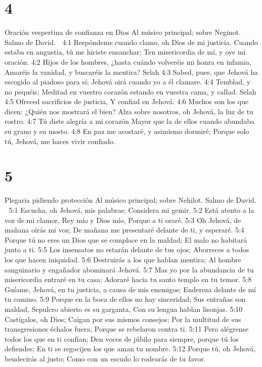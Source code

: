 \chapter{4}

Oración vespertina de confianza en Dios 
Al músico principal; sobre Neginot. Salmo de David. 

4:1 Respóndeme cuando clamo, oh Dios de mi justicia. 
Cuando estaba en angustia, tú me hiciste ensanchar; 
Ten misericordia de mí, y oye mi oración. 
4:2 Hijos de los hombres, ¿hasta cuándo volveréis mi honra en infamia, 
Amaréis la vanidad, y buscaréis la mentira? Selah 
4:3 Sabed, pues, que Jehová ha escogido al piadoso para sí; 
Jehová oirá cuando yo a él clamare. 
4:4 Temblad, y no pequéis; 
Meditad en vuestro corazón estando en vuestra cama, y callad. Selah 
4:5 Ofreced sacrificios de justicia, 
Y confiad en Jehová. 
4:6 Muchos son los que dicen: ¿Quién nos mostrará el bien? 
Alza sobre nosotros, oh Jehová, la luz de tu rostro. 
4:7 Tú diste alegría a mi corazón 
Mayor que la de ellos cuando abundaba su grano y su mosto. 
4:8 En paz me acostaré, y asimismo dormiré; 
Porque solo tú, Jehová, me haces vivir confiado. 

\chapter{5}

Plegaria pidiendo protección 
Al músico principal; sobre Nehilot. Salmo de David. 

5:1 Escucha, oh Jehová, mis palabras; 
Considera mi gemir. 
5:2 Está atento a la voz de mi clamor, Rey mío y Dios mío, 
Porque a ti oraré. 
5:3 Oh Jehová, de mañana oirás mi voz; 
De mañana me presentaré delante de ti, y esperaré. 
5:4 Porque tú no eres un Dios que se complace en la maldad; 
El malo no habitará junto a ti. 
5:5 Los insensatos no estarán delante de tus ojos; 
Aborreces a todos los que hacen iniquidad. 
5:6 Destruirás a los que hablan mentira; 
Al hombre sanguinario y engañador abominará Jehová. 
5:7 Mas yo por la abundancia de tu misericordia entraré en tu casa; 
Adoraré hacia tu santo templo en tu temor. 
5:8 Guíame, Jehová, en tu justicia, a causa de mis enemigos; 
Endereza delante de mí tu camino. 
5:9 Porque en la boca de ellos no hay sinceridad; 
Sus entrañas son maldad, 
Sepulcro abierto es su garganta, 
Con su lengua hablan lisonjas. 
5:10 Castígalos, oh Dios; 
Caigan por sus mismos consejos; 
Por la multitud de sus transgresiones échalos fuera, 
Porque se rebelaron contra ti. 
5:11 Pero alégrense todos los que en ti confían; 
Den voces de júbilo para siempre, porque tú los defiendes; 
En ti se regocijen los que aman tu nombre. 
5:12 Porque tú, oh Jehová, bendecirás al justo; 
Como con un escudo lo rodearás de tu favor. 

